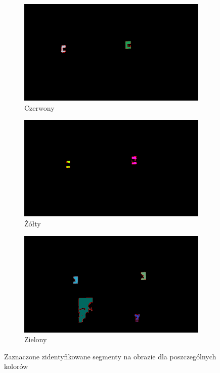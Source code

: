\begin{figure}[H]
\centering
\begin{subfigure}{.3\textwidth}
  \centering
  \includegraphics[width=.8\linewidth]{figures/img4_thresh_colored_red.png}
  \caption{Czerwony}
  \label{fig:sfig1}
\end{subfigure}
\begin{subfigure}{.3\textwidth}
  \centering
  \includegraphics[width=.8\linewidth]{figures/img4_thresh_colored_yellow.png}
  \caption{Żółty}
  \label{fig:sfig2}
\end{subfigure}
\begin{subfigure}{.3\textwidth}
  \centering
  \includegraphics[width=.8\linewidth]{figures/img4_thresh_colored_green.png}
  \caption{Zielony}
  \label{fig:sfig2}
\end{subfigure}
\caption{Zaznaczone zidentyfikowane segmenty na obrazie  dla poszczególnych kolorów}
\label{fig:segmenty_kolorow_poszczegolnych}
\end{figure}

